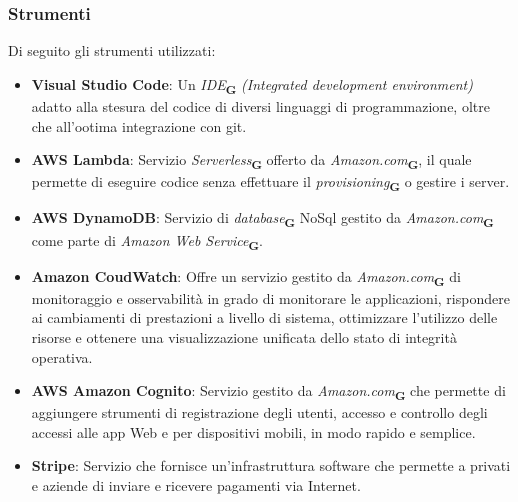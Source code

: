 \subsubsection{Strumenti}
Di seguito gli strumenti utilizzati:
\begin{itemize}
    \item \textbf{Visual Studio Code}: Un \textit{IDE}\textsubscript{\textbf{G}} \textit{(Integrated development environment)} adatto alla stesura del codice di diversi linguaggi di programmazione, oltre che all'ootima integrazione con git.
    \item \textbf{AWS Lambda}: Servizio \textit{Serverless}\textsubscript{\textbf{G}} offerto da \textit{Amazon.com}\textsubscript{\textbf{G}}, il quale permette di eseguire codice senza effettuare il \textit{provisioning}\textsubscript{\textbf{G}} o gestire i server.
    \item \textbf{AWS DynamoDB}: Servizio di \textit{database}\textsubscript{\textbf{G}} NoSql gestito da \textit{Amazon.com}\textsubscript{\textbf{G}} come parte di \textit{Amazon Web Service}\textsubscript{\textbf{G}}.
    \item \textbf{Amazon CoudWatch}: Offre un servizio gestito da \textit{Amazon.com}\textsubscript{\textbf{G}} di monitoraggio e osservabilità in grado di monitorare le applicazioni, rispondere ai cambiamenti di prestazioni a livello di sistema, ottimizzare l'utilizzo delle risorse e ottenere una visualizzazione unificata dello stato di integrità operativa.
    \item \textbf{AWS Amazon Cognito}: Servizio gestito da \textit{Amazon.com}\textsubscript{\textbf{G}} che permette di aggiungere strumenti di registrazione degli utenti, accesso e controllo degli accessi alle app Web e per dispositivi mobili, in modo rapido e semplice.
    \item \textbf{Stripe}: Servizio che fornisce un'infrastruttura software che permette a privati e aziende di inviare e ricevere pagamenti via Internet.
\end{itemize}

